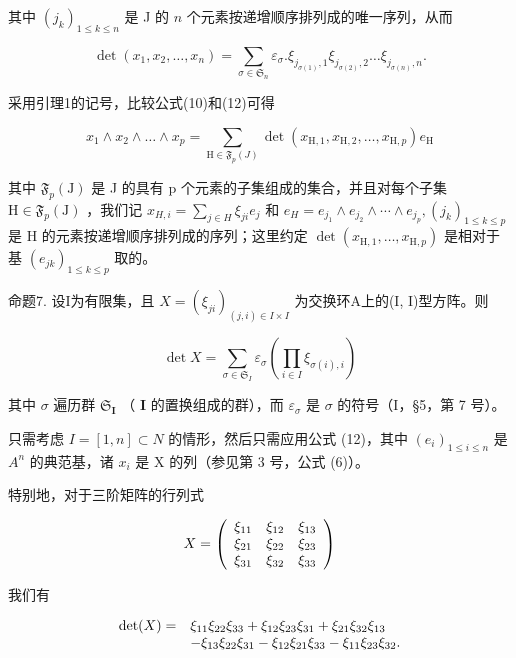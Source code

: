 其中 \((j_k)_{1\leqslant k\leqslant n}\) 是 J 的 \(n\) 个元素按递增顺序排列成的唯一序列，从而

\[
\det (x _ {1}, x _ {2}, \dots , x _ {n}) = \sum_ {\sigma \in \mathfrak {S} _ {n}} \varepsilon_ {\sigma}. \xi_ {j _ {\sigma (1)}, 1} \xi_ {j _ {\sigma (2)}, 2} \dots \xi_ {j _ {\sigma (n)}, n}.\tag{12}
\]

采用引理1的记号，比较公式(10)和(12)可得

\[
x _ {1} \wedge x _ {2} \wedge \dots \wedge x _ {p} = \sum_ {\mathrm{H} \in \mathfrak {F} _ {p} (J)} \det (x _ {\mathrm{H}, 1}, x _ {\mathrm{H}, 2}, \dots , x _ {\mathrm{H}, p}) e _ {\mathrm{H}}\tag{13}
\]

其中 \(\mathfrak{F}_{p}(\mathrm{J})\) 是 J 的具有 p 个元素的子集组成的集合，并且对每个子集 \(\mathrm{H}\in\mathfrak{F}_{p}(\mathrm{J})\) ，我们记 \(x_{H,i}=\sum_{j\in H}\xi_{ji}e_{j}\) 和 \(e_{H}=e_{j_{1}}\wedge e_{j_{2}}\wedge\cdots\wedge e_{j_{p}},(j_{k})_{1\leqslant k\leqslant p}\) 是 H 的元素按递增顺序排列成的序列；这里约定 \(\det(x_{\mathrm{H},1},\ldots,x_{\mathrm{H},p})\) 是相对于基 \((e_{jk})_{1\leqslant k\leqslant p}\) 取的。

命题7. 设I为有限集，且 \(X = (\xi_{ji})_{(j, i) \in I \times I}\) 为交换环A上的(I, I)型方阵。则

\[
\det X = \sum_ {\sigma \in \mathfrak {S} _ {I}} \varepsilon_ {\sigma} \left(\prod_ {i \in I} \xi_ {\sigma (i), i}\right)\tag{14}
\]

其中 \(\sigma\) 遍历群 \(\mathfrak{S}_{\mathbf{I}}\) （ \(\mathbf{I}\) 的置换组成的群），而 \(\varepsilon_{\sigma}\) 是 \(\sigma\) 的符号（I，§5，第 7 号）。

只需考虑 \(I = [1, n] \subset N\) 的情形，然后只需应用公式 (12)，其中 \((e_{i})_{1 \leqslant i \leqslant n}\) 是 \(A^{n}\) 的典范基，诸 \(x_{i}\) 是 X 的列（参见第 3 号，公式 (6)）。

特别地，对于三阶矩阵的行列式

\[
X = \left( \begin{array}{c c c} \xi_ {1 1} & \xi_ {1 2} & \xi_ {1 3} \\ \xi_ {2 1} & \xi_ {2 2} & \xi_ {2 3} \\ \xi_ {3 1} & \xi_ {3 2} & \xi_ {3 3} \end{array} \right)
\]

我们有

\[
\begin{array}{r l} \det (X) = & \xi_ {1 1} \xi_ {2 2} \xi_ {3 3} + \xi_ {1 2} \xi_ {2 3} \xi_ {3 1} + \xi_ {2 1} \xi_ {3 2} \xi_ {1 3} \\ & - \xi_ {1 3} \xi_ {2 2} \xi_ {3 1} - \xi_ {1 2} \xi_ {2 1} \xi_ {3 3} - \xi_ {1 1} \xi_ {2 3} \xi_ {3 2}. \end{array}
\]

